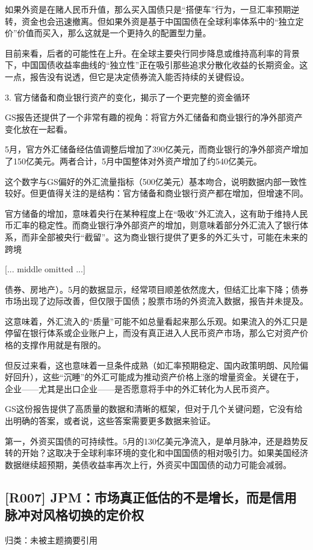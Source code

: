 \documentclass[11pt]{ctexart}
\begin{document}
如果外资是在赌人民币升值，那么买入国债只是“搭便车”行为，一旦汇率预期逆转，资金也会迅速撤离。但如果外资是基于中国国债在全球利率体系中的“独立定价”价值而买入，那么这就是一个更持久的配置型力量。

目前来看，后者的可能性在上升。在全球主要央行同步降息或维持高利率的背景下，中国国债收益率曲线的“独立性”正在吸引那些追求分散化收益的长期资金。这一点，报告没有说透，但它是决定债券流入能否持续的关键假设。

3. 官方储备和商业银行资产的变化，揭示了一个更完整的资金循环

GS报告还提供了一个非常有趣的视角：将官方外汇储备和商业银行的净外部资产变化放在一起看。

5月，官方外汇储备经估值调整后增加了390亿美元，而商业银行的净外部资产增加了150亿美元。两者合计，5月中国整体对外资产增加了约540亿美元。

这个数字与GS偏好的外汇流量指标（500亿美元）基本吻合，说明数据内部一致性较好。但更值得关注的是结构：官方储备和商业银行资产都在增加，但增速不同。

官方储备的增加，意味着央行在某种程度上在“吸收”外汇流入，这有助于维持人民币汇率的稳定性。而商业银行净外部资产的增加，则意味着部分外汇流入了银行体系，而非全部被央行“截留”。这为商业银行提供了更多的外汇头寸，可能在未来的跨境

[... middle omitted ...]

债券、房地产）。5月的数据显示，经常项目顺差依然庞大，但结汇比率下降；债券市场出现了边际改善，但仅限于国债；股票市场的外资流入数据，报告并未提及。

这意味着，外汇流入的“质量”可能不如总量看起来那么乐观。如果流入的外汇只是停留在银行体系或企业账户上，而没有真正进入人民币资产市场，那么它对资产价格的支撑作用就是有限的。

但反过来看，这也意味着一旦条件成熟（如汇率预期稳定、国内政策明朗、风险偏好回升），这些“沉睡”的外汇可能成为推动资产价格上涨的增量资金。关键在于，企业——尤其是出口企业——是否愿意将手中的外汇转化为人民币资产。

GS这份报告提供了高质量的数据和清晰的框架，但对于几个关键问题，它没有给出明确的答案，或者说，这些答案需要更多数据来验证。

第一，外资买国债的可持续性。5月的130亿美元净流入，是单月脉冲，还是趋势反转的开始？这取决于全球利率环境的变化和中国国债的相对吸引力。如果美国经济数据继续超预期，美债收益率再次上行，外资买中国国债的动力可能会减弱。

\subsection{[R007] JPM：市场真正低估的不是增长，而是信用脉冲对风格切换的定价权}
{\small\color{refgray}归类：未被主题摘要引用}
\end{document}
